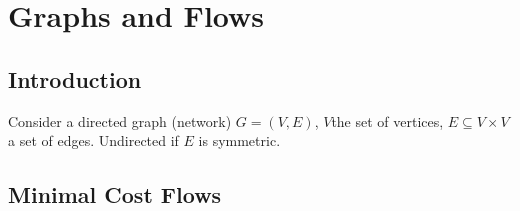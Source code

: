 \chapter{Graphs and Flows}
\label{cha:graphs-flows}


\section{Introduction}
\label{sec:introduction}

Consider a directed graph (network) $G = (V, E)$, $V$the set of
vertices, $E \subseteq V \times V$ a set of edges. Undirected if $E$
is symmetric.

\section{Minimal Cost Flows}
\label{sec:minimal-cost-flows}

